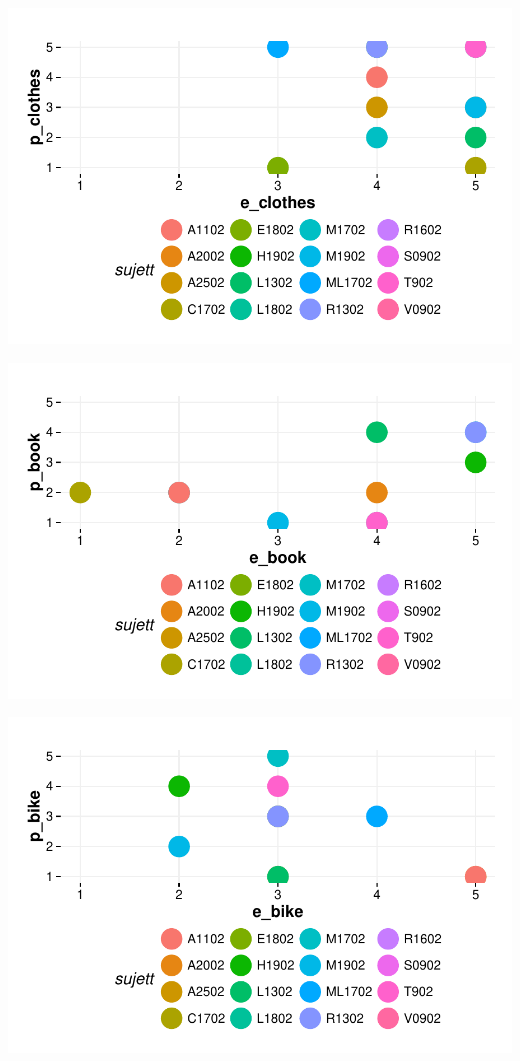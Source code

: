 \documentclass{article}
\begin{document}
\includegraphics{interviews-plot_coirs_parent_enfant_clothes}

\includegraphics{interviews-plot_coirs_parent_enfant_book}

\includegraphics{interviews-plot_coirs_parent_enfant_bike}
\end{document}
